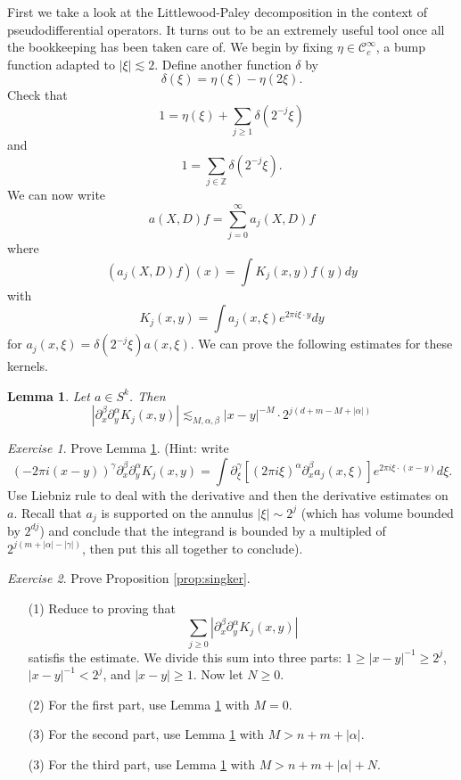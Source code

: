 \documentclass[11pt]{article}
\newtheorem{lem}[thm]{Lemma}
\theoremstyle{remark}
\newtheorem{exr}{Exercise}
\newcommand{\calC}{\mathcal{C}}
\newcommand{\1}{\textbf{1}}
\newcommand{\lle}{\lesssim}
\newcommand{\bbZ}{\mathbb{Z}}
\begin{document}
First we take a look at the Littlewood-Paley decomposition in the context of pseudodifferential operators. It turns out to be an extremely useful tool once all the bookkeeping has been taken care of. We begin by fixing $\eta \in \calC_c^\infty$, a bump function adapted to $|\xi| \lle 2$. Define another function $\delta$ by
\[
\delta(\xi) = \eta(\xi) - \eta(2\xi).
\]
Check that
\[
1 = \eta(\xi) + \sum_{j \geq 1} \delta(2^{-j} \xi)
\]
and 
\[
1 = \sum_{j \in \bbZ} \delta(2^{-j} \xi).
\]
We can now write
\[
a(X,D)f = \sum_{j=0}^\infty a_j(X,D) f
\]
where
\[
(a_j(X,D) f)(x) = \int K_j(x,y) f(y) dy
\]
with
\[
K_j(x,y) = \int a_j(x,\xi) e^{2 \pi i \xi \cdot y} dy
\]
for $a_j(x, \xi) = \delta(2^{-j} \xi) a(x,\xi)$.
We can prove the following estimates for these kernels.
\begin{lem}
Let $a \in S^k$. Then
\[
|\partial_x^\beta \partial_y^\alpha K_j(x,y)| \lle_{M, \alpha, \beta} |x-y|^{-M} \cdot 2^{j(d+m-M+|\alpha|)}
\]
\label{lem:ests}
\end{lem}
\begin{exr}
Prove Lemma \ref{lem:ests}. (Hint: write
\[
(-2 \pi i (x-y))^\gamma \partial_x^\beta \partial_y^\alpha K_j(x,y) = \int \partial_\xi^\gamma[(2\pi i \xi)^\alpha \partial_x^\beta a_j(x,\xi)] e^{2 \pi i \xi \cdot (x-y)} d\xi.
\]
Use Liebniz rule to deal with the derivative and then the derivative estimates on $a$. Recall that $a_j$ is supported on the annulus $|\xi| \sim 2^j$ (which has volume bounded by $2^{dj}$) and conclude that the integrand is bounded by a multipled of $2^{j(m + |\alpha| - |\gamma|)}$, then put this all together to conclude).
\end{exr}
\begin{exr}
Prove Proposition \ref{prop:singker}.
\begin{enumerate}
\item[(1)] Reduce to proving that
\[
\sum_{j \geq 0} |\partial_x^\beta \partial_y^\alpha K_j(x,y)|
\]
satisfis the estimate. We divide this sum into three parts: $1 \geq |x-y|^{-1} \geq 2^j$, $|x-y|^{-1} < 2^j$, and $|x-y| \geq 1$. Now let $N \geq 0$.
\item[(2)] For the first part, use Lemma \ref{lem:ests} with $M= 0 $.
\item[(3)] For the second part, use Lemma \ref{lem:ests} with $M > n+ m+|\alpha| $.
\item[(3)] For the third part, use Lemma \ref{lem:ests} with $M > n +m+|\alpha| + N $.
\end{enumerate}
\end{exr}
\end{document}
